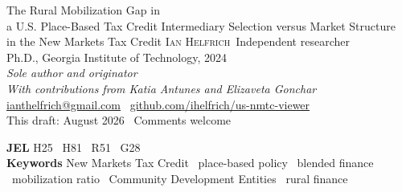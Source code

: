 \documentclass[11pt]{article}
\begin{document}
\thispagestyle{plain}

\wptitle
  {The Rural Mobilization Gap in\\ a U.S. Place-Based Tax Credit}
  {Intermediary Selection versus Market Structure\\ in the New Markets Tax Credit}
  {\textsc{Ian Helfrich}\,}
  {
   {\footnotesize\color{pencil} Independent researcher}\\[1pt]
   {\footnotesize\color{pencil} Ph.D., Georgia Institute of Technology, 2024}\\[2pt]
   \textit{Sole author and originator}\\[1pt]
   \textit{With contributions from Katia Antunes and Elizaveta Gonchar}\\[3pt]
   \href{mailto:ianthelfrich@gmail.com}{ianthelfrich@gmail.com}
   \textperiodcentered\
   \href{https://github.com/ihelfrich/us-nmtc-viewer}{github.com/ihelfrich/us-nmtc-viewer}\\[2pt]
   This draft: August 2026 \textperiodcentered\ Comments welcome}

\begin{abstract}

\end{abstract}

\begin{center}
\begin{minipage}{0.88\textwidth}
\footnotesize\color{pencil}
\textbf{\color{inkblack}JEL} \enspace H25 \textperiodcentered\ H81
\textperiodcentered\ R51 \textperiodcentered\ G28 \\[2pt]
\textbf{\color{inkblack}Keywords} \enspace New Markets Tax Credit
\textperiodcentered\ place-based policy \textperiodcentered\ blended finance
\textperiodcentered\ mobilization ratio \textperiodcentered\ Community
Development Entities \textperiodcentered\ rural finance
\end{minipage}
\end{center}

\vspace{1.2em}













\end{document}
